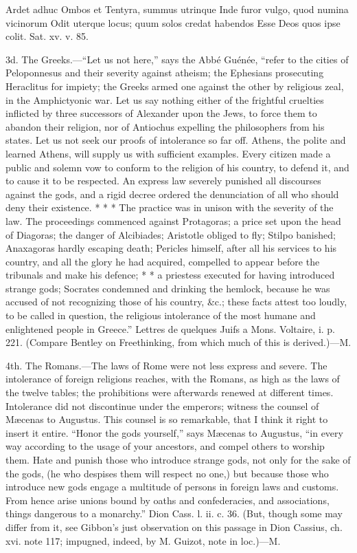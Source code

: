 Ardet adhuc Ombos et Tentyra, summus utrinque Inde furor vulgo,
quod numina vicinorum Odit uterque locus; quum solos credat
habendos Esse Deos quos ipse colit. Sat. xv. v. 85.

3d. The Greeks.—“Let us not here,” says the Abbé Guénée, “refer
to the cities of Peloponnesus and their severity against atheism;
the Ephesians prosecuting Heraclitus for impiety; the Greeks
armed one against the other by religious zeal, in the
Amphictyonic war. Let us say nothing either of the frightful
cruelties inflicted by three successors of Alexander upon the
Jews, to force them to abandon their religion, nor of Antiochus
expelling the philosophers from his states. Let us not seek our
proofs of intolerance so far off. Athens, the polite and learned
Athens, will supply us with sufficient examples. Every citizen
made a public and solemn vow to conform to the religion of his
country, to defend it, and to cause it to be respected. An
express law severely punished all discourses against the gods,
and a rigid decree ordered the denunciation of all who should
deny their existence. * * * The practice was in unison with the
severity of the law. The proceedings commenced against
Protagoras; a price set upon the head of Diagoras; the danger of
Alcibiades; Aristotle obliged to fly; Stilpo banished; Anaxagoras
hardly escaping death; Pericles himself, after all his services
to his country, and all the glory he had acquired, compelled to
appear before the tribunals and make his defence; * * a priestess
executed for having introduced strange gods; Socrates condemned
and drinking the hemlock, because he was accused of not
recognizing those of his country, \&c.; these facts attest too
loudly, to be called in question, the religious intolerance of
the most humane and enlightened people in Greece.” Lettres de
quelques Juifs a Mons. Voltaire, i. p. 221. (Compare Bentley on
Freethinking, from which much of this is derived.)—M.

4th. The Romans.—The laws of Rome were not less express and
severe. The intolerance of foreign religions reaches, with the
Romans, as high as the laws of the twelve tables; the
prohibitions were afterwards renewed at different times.
Intolerance did not discontinue under the emperors; witness the
counsel of Mæcenas to Augustus. This counsel is so remarkable,
that I think it right to insert it entire. “Honor the gods
yourself,” says Mæcenas to Augustus, “in every way according to
the usage of your ancestors, and compel others to worship them.
Hate and punish those who introduce strange gods, not only for
the sake of the gods, (he who despises them will respect no one,)
but because those who introduce new gods engage a multitude of
persons in foreign laws and customs. From hence arise unions
bound by oaths and confederacies, and associations, things
dangerous to a monarchy.” Dion Cass. l. ii. c. 36. (But, though
some may differ from it, see Gibbon’s just observation on this
passage in Dion Cassius, ch. xvi. note 117; impugned, indeed, by
M. Guizot, note in loc.)—M.

